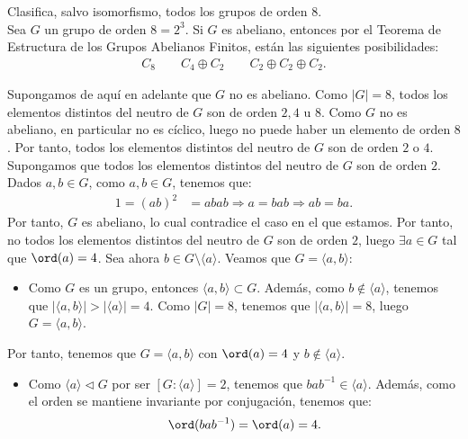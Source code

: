 \newpage
\begin{ejercicio}
    Clasifica, salvo isomorfismo, todos los grupos de orden \(8\).\\

    Sea $G$ un grupo de orden \(8=2^3\). Si $G$ es abeliano, entonces por el Teorema de Estructura de los Grupos Abelianos Finitos, están las siguientes posibilidades:
    \begin{gather*}
        C_8 \qquad C_4\oplus C_2 \qquad C_2\oplus C_2\oplus C_2.
    \end{gather*}

    Supongamos de aquí en adelante que \(G\) no es abeliano. Como $|G|=8$, todos los elementos distintos del neutro de \(G\) son de orden \(2, 4\) u \(8\). Como \(G\) no es abeliano, en particular no es cíclico, luego no puede haber un elemento de orden \(8\). Por tanto, todos los elementos distintos del neutro de \(G\) son de orden \(2\) o \(4\).\\

    Supongamos que todos los elementos distintos del neutro de \(G\) son de orden \(2\). Dados $a,b\in G$, como $a,b\in G$, tenemos que:
    \begin{align*}
        1 = (ab)^2 &= abab
        \Longrightarrow
        a=bab\Longrightarrow
        ab = ba.
    \end{align*}
    Por tanto, \(G\) es abeliano, lo cual contradice el caso en el que estamos. Por tanto, no todos los elementos distintos del neutro de \(G\) son de orden \(2\), luego $\exists a\in G$ tal que \(\ord(a) = 4\). Sea ahora $b\in G\setminus \langle a\rangle$. Veamos que $G=\langle a, b\rangle$:
    \begin{itemize}
        \item Como $G$ es un grupo, entonces $\langle a, b\rangle \subset G$. Además, como $b\notin \langle a\rangle$, tenemos que $|\langle a, b\rangle|>|\langle a\rangle|=4$. Como \(|G|=8\), tenemos que \(|\langle a, b\rangle| = 8\), luego \(G=\langle a, b\rangle\).
    \end{itemize}

    Por tanto, tenemos que $G=\langle a, b\rangle$ con \(\ord(a) = 4\) y \(b\notin \langle a\rangle\).
    \begin{itemize}
        \item Como $\langle a\rangle\lhd G$ por ser $[G:\langle a\rangle]=2$, tenemos que \(ba b^{-1}\in \langle a\rangle\). Además, como el orden se mantiene invariante por conjugación, tenemos que:
        \begin{equation*}
            \ord(ba b^{-1}) = \ord(a) = 4.
        \end{equation*}


\end{itemize}
\end{ejercicio}
